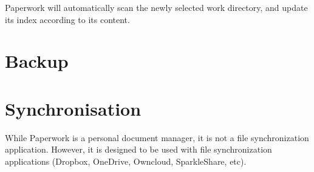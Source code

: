 \documentclass[10pt,a4paper]{article}
\begin{document}



Paperwork will automatically scan the newly selected work directory,
and update its index according to its content.

\section{Backup}

\section{Synchronisation}

While Paperwork is a personal document manager, it is not a file synchronization
application. However, it is designed to be used with file synchronization
applications (Dropbox, OneDrive, Owncloud, SparkleShare, etc).
\end{document}
